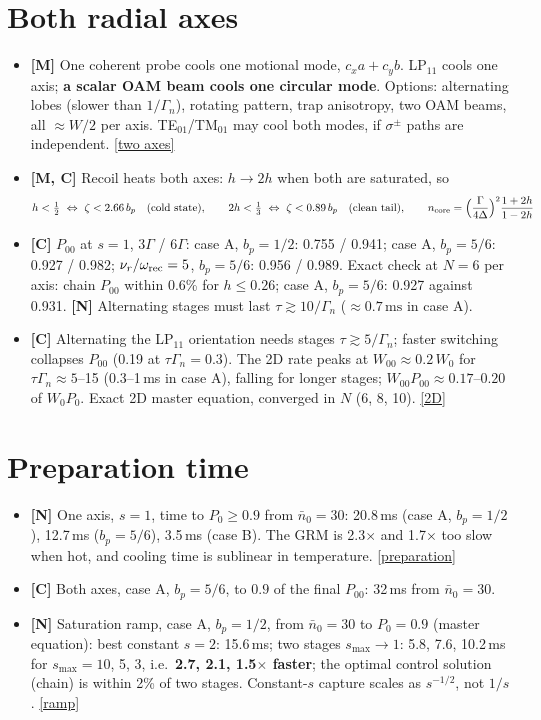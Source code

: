 \documentclass[10pt,a4paper]{article}
\newcommand{\SI}[2]{\ensuremath{#1\,\mathrm{#2}}}
\newcommand{\more}[2]{\href{report.pdf\##1}{[#2]}}
\begin{document}
\section*{Both radial axes}
\begin{itemize}
\item \textbf{[M]} One coherent probe cools one motional mode, $c_xa+c_yb$. LP$_{11}$ cools one axis; \textbf{a scalar OAM beam cools one circular mode}. Options: alternating lobes (slower than $1/\Gamma_n$), rotating pattern, trap anisotropy, two OAM beams, all $\approx W/2$ per axis. TE$_{01}$/TM$_{01}$ may cool both modes, if $\sigma^\pm$ paths are independent. \more{d:2d}{two axes}
\item \textbf{[M, C]} Recoil heats both axes: $h\to2h$ when both are saturated, so
\begin{equation*}
  h<\tfrac12\ \Leftrightarrow\ \zeta<2.66\,b_p\quad\text{(cold state)},\qquad 2h<\tfrac13\ \Leftrightarrow\ \zeta<0.89\,b_p\quad\text{(clean tail)},\qquad n_{\rm core}=\Big(\frac{\Gamma}{4\Delta}\Big)^2\frac{1+2h}{1-2h}
\end{equation*}
\item \textbf{[C]} $P_{00}$ at $s=1$, $3\Gamma$ / $6\Gamma$: case A, $b_p=1/2$: 0.755 / 0.941; case A, $b_p=5/6$: 0.927 / 0.982; $\nu_r/\omega_{\rm rec}=5$, $b_p=5/6$: 0.956 / 0.989. Exact check at $N=6$ per axis: chain $P_{00}$ within 0.6\% for $h\le0.26$; case A, $b_p=5/6$: 0.927 against 0.931. \textbf{[N]} Alternating stages must last $\tau\gtrsim10/\Gamma_n$ ($\approx\SI{0.7}{ms}$ in case A).
\item \textbf{[C]} Alternating the LP$_{11}$ orientation needs stages $\tau\gtrsim5/\Gamma_n$; faster switching collapses $P_{00}$ (0.19 at $\tau\Gamma_n=0.3$). The 2D rate peaks at $W_{00}\approx0.2\,W_0$ for $\tau\Gamma_n\approx5$--15 (0.3--1\,ms in case A), falling for longer stages; $W_{00}P_{00}\approx0.17$--$0.20$ of $W_0P_0$. Exact 2D master equation, converged in $N$ (6, 8, 10). \more{d:2d}{2D}
\end{itemize}

\section*{Preparation time}
\begin{itemize}
\item \textbf{[N]} One axis, $s=1$, time to $P_0\ge0.9$ from $\bar n_0=30$: 20.8\,ms (case A, $b_p=1/2$), 12.7\,ms ($b_p=5/6$), 3.5\,ms (case B). The GRM is 2.3$\times$ and 1.7$\times$ too slow when hot, and cooling time is sublinear in temperature. \more{d:prep}{preparation}
\item \textbf{[C]} Both axes, case A, $b_p=5/6$, to $0.9$ of the final $P_{00}$: 32\,ms from $\bar n_0=30$.
\item \textbf{[N]} Saturation ramp, case A, $b_p=1/2$, from $\bar n_0=30$ to $P_0=0.9$ (master equation): best constant $s=2$: 15.6\,ms; two stages $s_{\max}\to1$: 5.8, 7.6, 10.2\,ms for $s_{\max}=10$, 5, 3, i.e.\ \textbf{2.7, 2.1, 1.5$\times$ faster}; the optimal control solution (chain) is within 2\% of two stages. Constant-$s$ capture scales as $s^{-1/2}$, not $1/s$. \more{d:prep}{ramp}
\end{itemize}
\end{document}
